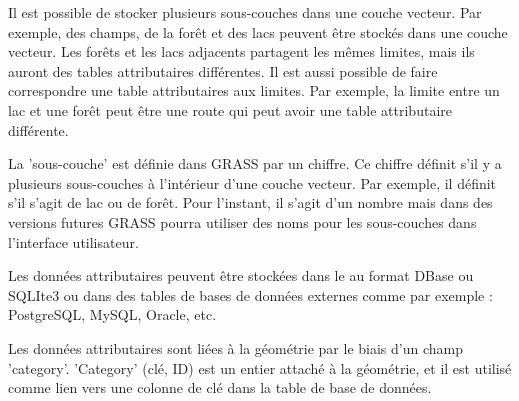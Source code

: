 Il est possible de stocker plusieurs sous-couches dans une couche vecteur. Par exemple, des champs, de la forêt et des lacs peuvent être stockés dans une couche vecteur. Les forêts et les lacs adjacents partagent les mêmes limites, mais ils auront des tables attributaires différentes. Il est aussi possible de faire correspondre une table attributaires aux limites. Par exemple, la limite entre un lac et une forêt peut être une route qui peut avoir une table attributaire différente.

La 'sous-couche' est définie dans GRASS par un chiffre. Ce chiffre définit s'il y a plusieurs sous-couches à l'intérieur d'une couche vecteur. Par exemple, il définit s'il s'agit de lac ou de forêt. Pour l'instant, il s'agit d'un nombre mais dans des versions futures GRASS pourra utiliser des noms pour les sous-couches dans l'interface utilisateur.

Les données attributaires peuvent être stockées dans le  au format DBase ou SQLIte3 ou dans des tables de bases de données externes comme par exemple : PostgreSQL, MySQL, Oracle, etc.

Les données attributaires sont liées à la géométrie par le biais d'un champ 'category'. 'Category' (clé, ID) est un entier attaché à la géométrie, et il est utilisé comme lien vers une colonne de clé dans la table de base de données.


